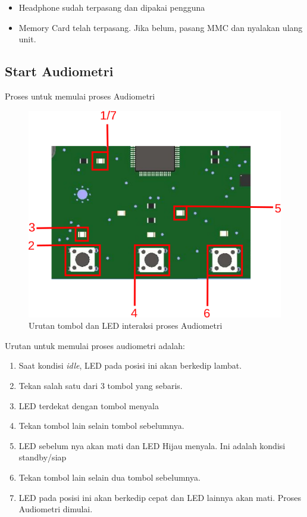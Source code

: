 \documentclass[12pt,]{article}
\begin{document}
	\begin{itemize}
		\item Headphone sudah terpasang dan dipakai pengguna
		\item Memory Card telah terpasang.
		Jika belum, pasang MMC dan nyalakan ulang unit.
	\end{itemize}
	
	\newpage
	\subsection{Start Audiometri}
	
	Proses untuk memulai proses Audiometri
	
	\begin{figure}[!ht]
		\centering
		\includegraphics[width=350pt]{images/ledbutton_step}
		\caption{Urutan tombol dan LED interaksi proses Audiometri}
	\end{figure}
	
	Urutan untuk memulai proses audiometri adalah:
	
	\begin{enumerate}
		\item Saat kondisi \textit{idle}, LED pada posisi ini akan berkedip lambat.
		
		\item Tekan salah satu dari 3 tombol yang sebaris.
		
		\item LED terdekat dengan tombol menyala
		
		\item Tekan tombol lain selain tombol sebelumnya.
		
		\item LED sebelum nya akan mati dan LED Hijau menyala.
		Ini adalah kondisi standby/siap
		
		\item Tekan tombol lain selain dua tombol sebelumnya.
		
		\item LED pada posisi ini akan berkedip cepat dan LED lainnya akan mati.
		Proses Audiometri dimulai.
		
	\end{enumerate}
	
\end{document}
